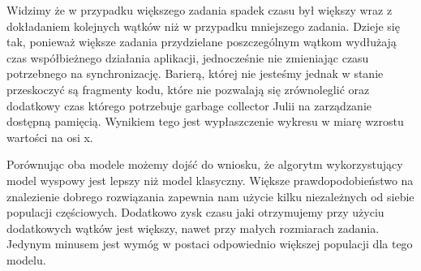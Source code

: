 Widzimy że w przypadku większego zadania spadek czasu był większy wraz z dokładaniem kolejnych wątków niż w przypadku mniejszego zadania. Dzieje się 
tak, ponieważ większe zadania przydzielane poszczególnym wątkom wydłużają czas współbieżnego działania aplikacji, jednocześnie nie zmieniając czasu
potrzebnego na synchronizację. Barierą, której nie jesteśmy jednak w stanie przeskoczyć 
są fragmenty kodu, które nie pozwalają się zrównoleglić oraz dodatkowy czas którego potrzebuje garbage collector Julii na zarządzanie dostępną pamięcią. 
Wynikiem tego jest wypłaszczenie wykresu w miarę wzrostu wartości na osi x.

Porównując oba modele możemy dojść do wniosku, że algorytm wykorzystujący model wyspowy jest lepszy niż model klasyczny. Większe prawdopodobieństwo 
na znalezienie dobrego rozwiązania zapewnia nam użycie kilku niezależnych od siebie populacji częściowych. Dodatkowo zysk czasu jaki otrzymujemy 
przy użyciu dodatkowych wątków jest większy, nawet przy małych rozmiarach zadania. Jedynym minusem jest wymóg w postaci odpowiednio większej 
populacji dla tego modelu. 